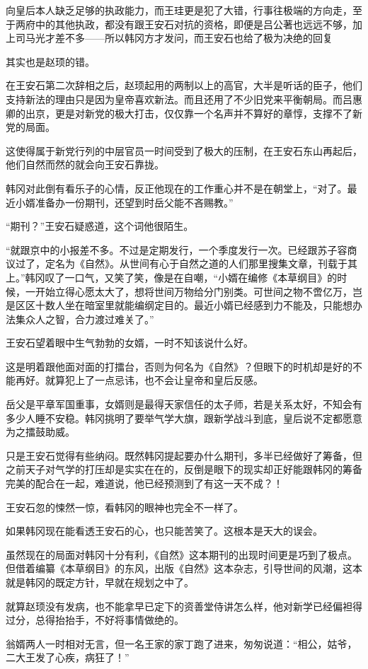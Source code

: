 向皇后本人缺乏足够的执政能力，而王珪更是犯了大错，行事往极端的方向走，至于两府中的其他执政，都没有跟王安石对抗的资格，即便是吕公著也远远不够，加上司马光才差不多——所以韩冈方才发问，而王安石也给了极为决绝的回复

其实也是赵顼的错。

在王安石第二次辞相之后，赵顼起用的两制以上的高官，大半是听话的臣子，他们支持新法的理由只是因为皇帝喜欢新法。而且还用了不少旧党来平衡朝局。而吕惠卿的出京，更是对新党的极大打击，仅仅靠一个名声并不算好的章惇，支撑不了新党的局面。

这使得属于新党行列的中层官员一时间受到了极大的压制，在王安石东山再起后，他们自然而然的就会向王安石靠拢。

韩冈对此倒有看乐子的心情，反正他现在的工作重心并不是在朝堂上，“对了。最近小婿准备办一份期刊，还望到时岳父能不吝赐教。”

“期刊？”王安石疑惑道，这个词他很陌生。

“就跟京中的小报差不多。不过是定期发行，一个季度发行一次。已经跟苏子容商议过了，定名为《自然》。从世间有心于自然之道的人们那里搜集文章，刊载于其上。”韩冈叹了一口气，又笑了笑，像是在自嘲，“小婿在编修《本草纲目》的时候，一开始立得心愿太大了，想将世间万物给分门别类。可世间之物不啻亿万，岂是区区十数人坐在暗室里就能编纲定目的。最近小婿已经感到力不能及，只能想办法集众人之智，合力渡过难关了。”

王安石望着眼中生气勃勃的女婿，一时不知该说什么好。

这是明着跟他面对面的打擂台，否则为何名为《自然》？但眼下的时机却是好的不能再好。就算犯上了一点忌讳，也不会让皇帝和皇后反感。

岳父是平章军国重事，女婿则是最得天家信任的太子师，若是关系太好，不知会有多少人睡不安稳。韩冈挑明了要举气学大旗，跟新学战斗到底，皇后说不定都愿意为之擂鼓助威。

只是王安石觉得有些纳闷。既然韩冈提起要办什么期刊，多半已经做好了筹备，但之前天子对气学的打压却是实实在在的，反倒是眼下的现实却正好能跟韩冈的筹备完美的配合在一起，难道说，他已经预测到了有这一天不成？！

王安石忽的悚然一惊，看韩冈的眼神也完全不一样了。

如果韩冈现在能看透王安石的心，也只能苦笑了。这根本是天大的误会。

虽然现在的局面对韩冈十分有利，《自然》这本期刊的出现时间更是巧到了极点。但借着编纂《本草纲目》的东风，出版《自然》这本杂志，引导世间的风潮，这本就是韩冈的既定方针，早就在规划之中了。

就算赵顼没有发病，也不能拿早已定下的资善堂侍讲怎么样，他对新学已经偏袒得过分，总得抬抬手，不好将事情做绝的。

翁婿两人一时相对无言，但一名王家的家丁跑了进来，匆匆说道：“相公，姑爷，二大王发了心疾，病狂了！”


